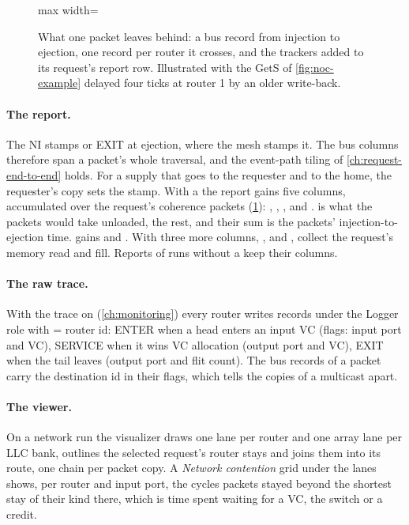 \begin{figure}[htbp]\centering
\begin{adjustbox}{max width=\textwidth}\end{adjustbox}
\caption{What one packet leaves behind: a bus record from injection to ejection, one record per
router it crosses, and the trackers added to its request's report row. Illustrated with the GetS
of \cref{fig:noc-example} delayed four ticks at router 1 by an older write-back.}
\label{fig:noc-observe}
\end{figure}

\paragraph{The report.} The NI stamps  or  EXIT at ejection, where
the mesh stamps it. The  bus columns therefore span a packet's whole traversal,
and the event-path tiling of \cref{ch:request-end-to-end} holds. For a supply that goes to the
requester and to the home, the requester's copy sets the stamp. With a  the report
gains five columns, accumulated over the request's coherence packets (\cref{fig:noc-observe}):
, , ,  and .
 is what the packets would take unloaded,  the rest, and
their sum is the packets' injection-to-ejection time.  gains  and . With  three more columns,
,  and , collect the request's memory read
and fill. Reports of runs without a  keep their columns.

\paragraph{The raw trace.} With the trace on (\cref{ch:monitoring}) every router writes records
under the Logger role  with  = router id: ENTER when a head enters an input VC
(flags: input port and VC), SERVICE when it wins VC allocation (output port and VC), EXIT when the
tail leaves (output port and flit count). The bus records of a packet carry the destination id in
their flags, which tells the copies of a multicast apart.

\paragraph{The viewer.} On a network run the visualizer draws one lane per router and one array
lane per LLC bank, outlines the selected request's router stays and joins them into its route, one
chain per packet copy. A \emph{Network contention} grid under the lanes shows, per router and input
port, the cycles packets stayed beyond the shortest stay of their kind there, which is time spent
waiting for a VC, the switch or a credit.

